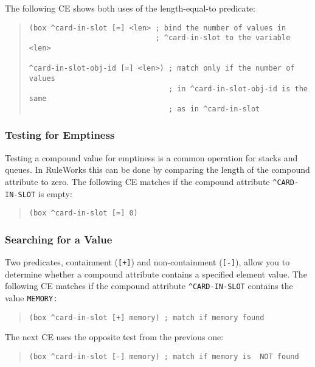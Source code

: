 The following CE shows both uses of the length-equal-to predicate:
\begin{quote}
\begin{verbatim}
(box ^card-in-slot [=] <len> ; bind the number of values in
                             ; ^card-in-slot to the variable <len>

^card-in-slot-obj-id [=] <len>) ; match only if the number of values
                                ; in ^card-in-slot-obj-id is the same
                                ; as in ^card-in-slot
\end{verbatim}
\end{quote}

\subsubsection*{Testing for Emptiness}

Testing a compound value for emptiness is a common operation for
stacks and queues. In RuleWorks this can be done by comparing the
length of the compound attribute to zero. The following CE matches if
the compound attribute \verb|^CARD-IN-SLOT| is empty:
\begin{quote}
\begin{verbatim}
(box ^card-in-slot [=] 0)
\end{verbatim}
\end{quote}
   
\subsubsection*{Searching for a Value}

Two predicates, containment (\verb|[+]|) and non-containment
(\verb|[-]|), allow you to determine whether a compound attribute
contains a specified element value. The following CE matches if the
compound attribute \verb|^CARD-IN-SLOT| contains the value
\tt{MEMORY}:
\begin{quote}
\begin{verbatim}
(box ^card-in-slot [+] memory) ; match if memory found
\end{verbatim}
\end{quote}

The next CE uses the opposite test from the previous one:

\begin{quote}
\begin{verbatim}
(box ^card-in-slot [-] memory) ; match if memory is  NOT found
\end{verbatim}
\end{quote}
   
